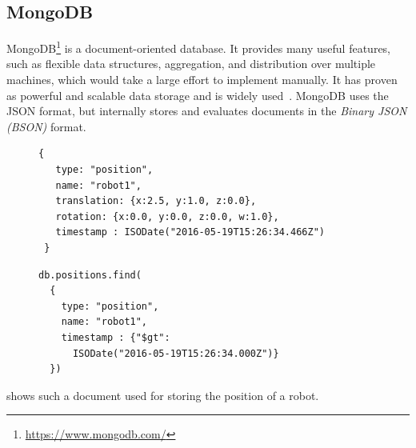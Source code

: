 \subsection{MongoDB}
\label{sec:mongodb}
MongoDB\footnote{\url{https://www.mongodb.com/}} is a
document-oriented database. It provides many useful
features, such as flexible data structures, aggregation, and
distribution over multiple machines, which would take a large effort
to implement manually. It has proven as powerful and scalable data
storage and is widely used~\cite{mongodb,RoboDB}. MongoDB uses the
JSON format, but internally stores and evaluates documents in the
\emph{Binary JSON (BSON)} format.
\begin{figure}
  \begin{minipage}{0.58\linewidth}
\begin{lstlisting}[style=SmallJSON,
  caption={MongoDB document representing\protect\\ the position of a robot},
  label=lst:mongo-document,
  framexleftmargin=2pt, xleftmargin=2pt,
 morekeywords={}, numbers=none]
 {
   type: "position",
   name: "robot1",
   translation: {x:2.5, y:1.0, z:0.0},
   rotation: {x:0.0, y:0.0, z:0.0, w:1.0},
   timestamp : ISODate("2016-05-19T15:26:34.466Z")
 }
\end{lstlisting}
  \end{minipage}
  \begin{minipage}{0.42\linewidth}
\begin{lstlisting}[style=SmallJSON,
  caption={MongoDB query yielding the document in \reflst{lst:mongo-document}},
  label=lst:mongo-query,
  framexleftmargin=2pt, xleftmargin=10pt,
 morekeywords={}, numbers=none]
db.positions.find(
  {
    type: "position",
    name: "robot1",
    timestamp : {"$gt":
      ISODate("2016-05-19T15:26:34.000Z")}
  })
\end{lstlisting} %
  \end{minipage}
  \vspace{-0.8cm}
\end{figure}
 shows such a document
used for storing the position of a robot.

